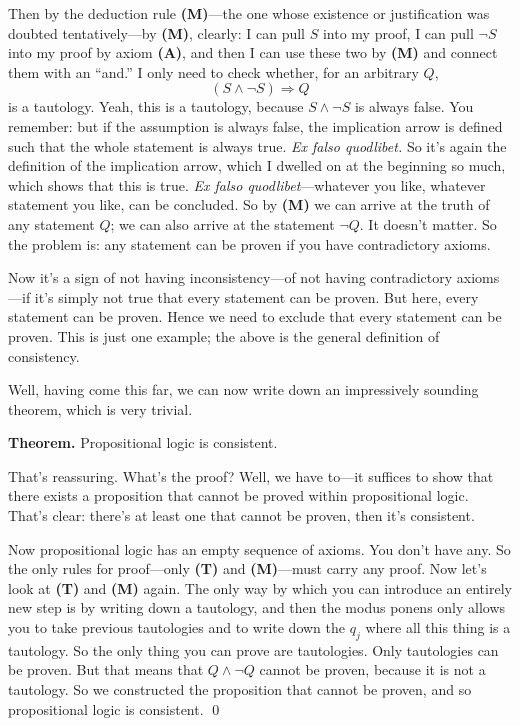 Then by the deduction rule \textbf{(M)}---the one whose existence or justification was doubted tentatively---by \textbf{(M)}, clearly: I can pull $S$ into my proof, I can pull $\lnot S$ into my proof by axiom \textbf{(A)}, and then I can use these two by \textbf{(M)} and connect them with an ``and.'' I only need to check whether, for an arbitrary $Q$,
\[
(S \land \lnot S) \Rightarrow Q
\]
is a tautology. Yeah, this is a tautology, because $S \land \lnot S$ is always false. You remember: but if the assumption is always false, the implication arrow is defined such that the whole statement is always true. \emph{Ex falso quodlibet.} So it's again the definition of the implication arrow, which I dwelled on at the beginning so much, which shows that this is true. \emph{Ex falso quodlibet}---whatever you like, whatever statement you like, can be concluded. So by \textbf{(M)} we can arrive at the truth of any statement $Q$; we can also arrive at the statement $\lnot Q$. It doesn't matter. So the problem is: any statement can be proven if you have contradictory axioms.

Now it's a sign of not having inconsistency---of not having contradictory axioms---if it's simply not true that every statement can be proven. But here, every statement can be proven. Hence we need to exclude that every statement can be proven. This is just one example; the above is the general definition of consistency.

Well, having come this far, we can now write down an impressively sounding theorem, which is very trivial.

\textbf{Theorem.} Propositional logic is consistent.

That's reassuring. What's the proof? Well, we have to---it suffices to show that there exists a proposition that cannot be proved within propositional logic. That's clear: there's at least one that cannot be proven, then it's consistent.

Now propositional logic has an empty sequence of axioms. You don't have any. So the only rules for proof---only \textbf{(T)} and \textbf{(M)}---must carry any proof. Now let's look at \textbf{(T)} and \textbf{(M)} again. The only way by which you can introduce an entirely new step is by writing down a tautology, and then the modus ponens only allows you to take previous tautologies and to write down the $q_j$ where all this thing is a tautology. So the only thing you can prove are tautologies. Only tautologies can be proven. But that means that $Q \land \lnot Q$ cannot be proven, because it is not a tautology. So we constructed the proposition that cannot be proven, and so propositional logic is consistent. \qed

